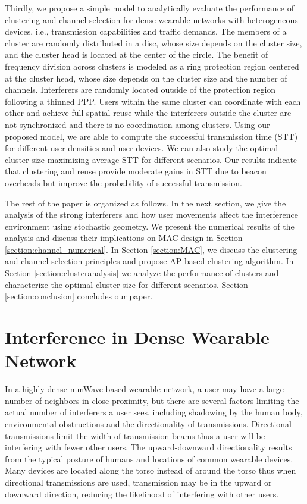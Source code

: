 \documentclass[10pt, conference, letterpaper]{IEEEtran}
\begin{document}
Thirdly, we propose a simple model to analytically evaluate the performance of clustering and channel selection for dense wearable networks with heterogeneous devices, i.e., transmission capabilities and traffic demands. The members of a cluster are randomly distributed in a disc, whose size depends on the cluster size, and the cluster head is located at the center of the circle. The benefit of frequency division across clusters is modeled as a ring protection region centered at the cluster head, whose size depends on the cluster size and the number of channels. Interferers are randomly located outside of the protection region following a thinned PPP. Users within the same cluster can coordinate with each other and achieve full spatial reuse while the interferers outside the cluster are not synchronized and there is no coordination among clusters. Using our proposed model, we are able to compute the successful transmission time (STT) for different user densities and user devices. We can also study the optimal cluster size maximizing average STT for different scenarios. Our results indicate that clustering and reuse provide moderate gains in STT due to beacon overheads but improve the probability of successful transmission. 

The rest of the paper is organized as follows. In the next section, we give the analysis of the strong interferers and how user movements affect the interference environment using stochastic geometry. We present the numerical results of the analysis and discuss their implications on MAC design in Section \ref{section:channel_numerical}. In Section \ref{section:MAC}, we discuss the clustering and channel selection principles and propose AP-based clustering algorithm. In Section \ref{section:clusteranalysis} we analyze the performance of clusters and characterize the optimal cluster size for different scenarios. Section \ref{section:conclusion} concludes our paper. 

\section{Interference in Dense Wearable Network}\label{section:channel}
In a highly dense mmWave-based wearable network, a user may have a large number of neighbors in close proximity, but there are several factors limiting the actual number of interferers a user sees, including shadowing by the human body, environmental obstructions and the directionality of transmissions.
Directional transmissions limit the width of transmission beams thus a user will be interfering with fewer other users. 
The upward-downward directionality results from the typical posture of humans and locations of common wearable devices.
Many devices are located along the torso instead of around the torso thus when directional transmissions are used, transmission may be in the upward or downward direction, reducing the likelihood of interfering with other users. 
\end{document}
